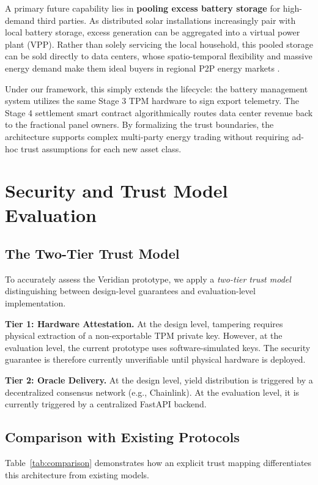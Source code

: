 \documentclass[conference]{IEEEtran}
\begin{document}
A primary future capability lies in \textbf{pooling excess battery storage} for high-demand third parties. As distributed solar installations increasingly pair with local battery storage, excess generation can be aggregated into a virtual power plant (VPP). Rather than solely servicing the local household, this pooled storage can be sold directly to data centers, whose spatio-temporal flexibility and massive energy demand make them ideal buyers in regional P2P energy markets \cite{jin2025data}. 

Under our framework, this simply extends the lifecycle: the battery management system utilizes the same Stage 3 TPM hardware to sign export telemetry. The Stage 4 settlement smart contract algorithmically routes data center revenue back to the fractional panel owners. By formalizing the trust boundaries, the architecture supports complex multi-party energy trading without requiring ad-hoc trust assumptions for each new asset class.

\section{Security and Trust Model Evaluation}
\label{sec:evaluation}

\subsection{The Two-Tier Trust Model}
To accurately assess the Veridian prototype, we apply a \emph{two-tier trust model} distinguishing between design-level guarantees and evaluation-level implementation. 

\textbf{Tier 1: Hardware Attestation.} At the design level, tampering requires physical extraction of a non-exportable TPM private key. However, at the evaluation level, the current prototype uses software-simulated keys. The security guarantee is therefore currently unverifiable until physical hardware is deployed.

\textbf{Tier 2: Oracle Delivery.} At the design level, yield distribution is triggered by a decentralized consensus network (e.g., Chainlink). At the evaluation level, it is currently triggered by a centralized FastAPI backend. 

\subsection{Comparison with Existing Protocols}
Table~\ref{tab:comparison} demonstrates how an explicit trust mapping differentiates this architecture from existing models.
\end{document}
